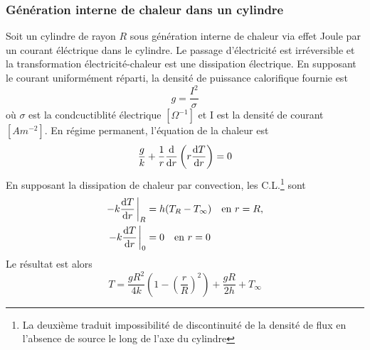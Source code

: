       \subsubsection{Génération interne de chaleur dans un cylindre}
        Soit un cylindre de rayon $R$ sous génération interne de chaleur via effet Joule par un courant éléctrique dans le cylindre. Le passage d'électricité est irréversible et la transformation électricité-chaleur est une dissipation électrique. En supposant le courant uniformément réparti, la densité de puissance calorifique fournie est
        \begin{equation}
          g = \frac{I^2}{\sigma}
        \end{equation}
        où $\sigma$ est la condcuctiblité électrique $[\Omega^{-1}]$ et I est la densité de courant $[Am^{-2}]$. En régime permanent, l'équation de la chaleur est
        \begin{equation}
          \frac{g}{k} + \frac{1}{r}\dv{r}\left(r \dv{T}{r}\right) = 0
        \end{equation}
        En supposant la dissipation de chaleur par convection, les C.L.\footnote{La deuxième traduit impossibilité de discontinuité de la densité de flux en l'absence de source le long de l'axe du cylindre} sont
        \begin{equation}
          \begin{aligned}
            -k \dv{T}{r} \eval_R &= h (T_R - T_\infty) \quad \textrm{en } r = R,\\
            -k \dv{T}{r} \eval_0 &= 0 \quad \textrm{en } r = 0
          \end{aligned}
        \end{equation}
        Le résultat est alors
        \begin{equation}
          T = \frac{gR^2}{4k}\left(1-\left(\frac{r}{R}\right)^2\right) + \frac{gR}{2h} + T_\infty
        \end{equation}

